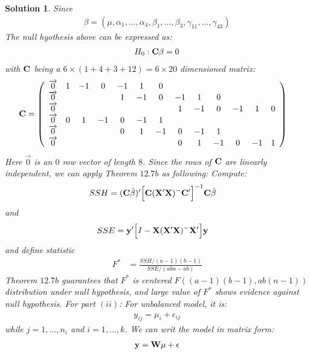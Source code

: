 \documentclass[11pt]{article}
\newtheorem{sol}{Solution}
\begin{document}
\begin{sol}
	Since
	\begin{align*}
		\beta = (\mu, \alpha_1, \ldots, \alpha_4, \beta_1, \ldots, \beta_3, \gamma_{11}, \ldots, \gamma_{43})
	\end{align*}
	The null hyothesis above can be expressed as:
	\begin{align*}
		H_0: {\bf C}{\bf \beta} = 0
	\end{align*}
	with ${\bf C}$ being a $6 \times (1 + 4 + 3 + 12) = 6 \times 20$ dimensioned matrix:
	\begin{align*}
 		{\bf C} &= \left(\begin{array}{ccccccccccccc} \overrightarrow{0}&1&-1&0&-1&1&0&&&&&&\\ \overrightarrow{0}&&&&1&-1&0&-1&1&0&&&\\ \overrightarrow{0}&&&&&&&1&-1&0&-1&1&0\\ \overrightarrow{0}&0&1&-1&0&-1&1&&&&&&\\ \overrightarrow{0}&&&&0&1&-1&0&-1&1&&&\\ \overrightarrow{0}&&&&&&&0&1&-1&0&-1&1\end{array}\right)
	\end{align*}
	Here $\overrightarrow{0}$ is an $0$ row vector of length $8$.\vskip 2mm
	Since the rows of ${\bf C}$ are linearly independent, we can apply Theorem $12.7b$ as following:\vskip 2mm
	Compute:
	\begin{align*}
		SSH &= ({\bf C}\hat{\beta})'\Big[{\bf C}({\bf X}'{\bf X})^{-}{\bf C}'\Big]^{-1}{\bf C}\hat{\beta}
	\end{align*}
	and 
	\begin{align*}
		SSE &= {\bf y}'\Big[I - {\bf X}({\bf X}'{\bf X})^-{\bf X}'\Big]{\bf y}
	\end{align*}
	and define statistic
	\begin{align*}
		F^{\ast} &= \frac{SSH/(a-1)(b-1)}{SSE/(abn-ab)}
	\end{align*}
	Theorem $12.7b$ guarantees that $F^{\ast}$ is centered $F((a-1)(b-1), ab(n - 1))$ distribution under null hypothesis, and large value of $F^{\ast}$ shows evidence against null hypothesis.\vskip 2mm
	For part $(ii)$:\vskip 2mm
	For unbalanced model,  it is:
	\begin{align*}
		y_{ij} = \mu_i + \epsilon_{ij}
	\end{align*}
	while $j = 1, \ldots, n_i$ and $i = 1, \ldots, k$.\vskip 2mm
	We can writ the model in matrix form:
	\begin{align*}
		{\bf y} = {\bf W}{\mu} + {\bf \epsilon}
	\end{align*}

\end{sol}
\end{document}
